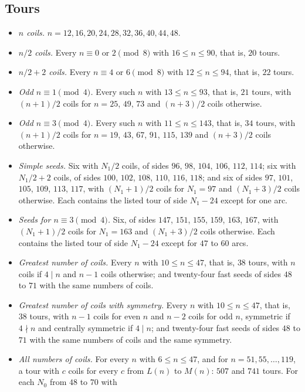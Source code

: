 \documentclass[11pt]{amsart}
\theoremstyle{remark}
\begin{document}
\subsection*{Tours}
\begin{itemize}
\item \emph{$n$ coils.} $n=12,16,20,24,28,32,36,40,44,48$.
\item \emph{$n/2$ coils.} Every $n\equiv0$ or $2\pmod 8$ with $16\le n\le90$, that is, $20$ tours.
\item \emph{$n/2+2$ coils.} Every $n\equiv4$ or $6\pmod 8$ with $12\le n\le94$, that is, $22$ tours.
\item \emph{Odd $n\equiv1\pmod 4$.} Every such $n$ with $13\le n\le93$, that is, $21$ tours, with $(n+1)/2$ coils
for $n=25$, $49$, $73$ and $(n+3)/2$ coils otherwise.
\item \emph{Odd $n\equiv3\pmod 4$.} Every such $n$ with $11\le n\le143$, that is, $34$ tours, with $(n+1)/2$ coils
for $n=19$, $43$, $67$, $91$, $115$, $139$ and $(n+3)/2$ coils otherwise.
\item \emph{Simple seeds.} Six with $N_1/2$ coils, of sides $96$, $98$, $104$, $106$, $112$, $114$; six with $N_1/2+2$
coils, of sides $100$, $102$, $108$, $110$, $116$, $118$; and six of sides $97$, $101$, $105$, $109$, $113$, $117$,
with $(N_1+1)/2$ coils for $N_1=97$ and $(N_1+3)/2$ coils otherwise. Each contains the listed tour of side $N_1-24$
except for one arc.
\item \emph{Seeds for $n\equiv3\pmod 4$.} Six, of sides $147$, $151$, $155$, $159$, $163$, $167$, with $(N_1+1)/2$
coils for $N_1=163$ and $(N_1+3)/2$ coils otherwise. Each contains the listed tour of side $N_1-24$ except for
$47$ to $60$ arcs.
\item \emph{Greatest number of coils.} Every $n$ with $10\le n\le47$, that is, $38$ tours, with $n$ coils if
$4\mid n$ and $n-1$ coils otherwise; and twenty-four fast seeds of sides $48$ to $71$ with the same numbers of
coils.
\item \emph{Greatest number of coils with symmetry.} Every $n$ with $10\le n\le47$, that is, $38$ tours, with
$n-1$ coils for even $n$ and $n-2$ coils for odd $n$, symmetric if $4\nmid n$ and centrally symmetric if $4\mid n$;
and twenty-four fast seeds of sides $48$ to $71$ with the same numbers of coils and the same symmetry.
\item \emph{All numbers of coils.} For every $n$ with $6\le n\le47$, and for $n=51,55,\dots,119$, a tour with $c$
coils for every $c$ from $L(n)$ to $M(n)$: $507$ and $741$ tours. For each $N_0$ from $48$ to $70$ with

\end{itemize}
\end{document}
